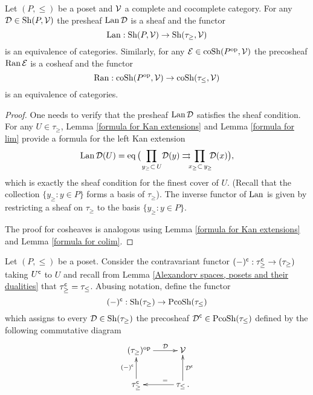 \documentclass[main.tex]{subfiles}
\begin{document}
\begin{lemma}
Let $(P,\leq)$ be a poset and $\operatorname{\mathcal{V}}$ a complete and cocomplete category. For any $\operatorname{\mathcal{D}}\in\operatorname{Sh}(P,\operatorname{\mathcal{V}})$ the presheaf $\operatorname{Lan}\operatorname{\mathcal{D}}$ is a sheaf and the functor $$\operatorname{Lan}:\operatorname{Sh}(P,\operatorname{\mathcal{V}})\to\operatorname{Sh}(\tau_{\geq},\operatorname{\mathcal{V}})$$ is an equivalence of categories.
Similarly, for any $\operatorname{\mathcal{E}}\in\operatorname{coSh}(P^{\mathrm{op}},\operatorname{\mathcal{V}})$ the precosheaf $\operatorname{Ran}\operatorname{\mathcal{E}}$ is a cosheaf and the functor $$\operatorname{Ran}:\operatorname{coSh}(P^{\mathrm{op}},\operatorname{\mathcal{V}})\to\operatorname{coSh}(\tau_{\leq},\operatorname{\mathcal{V}})$$ is an equivalence of categories.
\begin{proof}
One needs to verify that the presheaf $\operatorname{Lan}\operatorname{\mathcal{D}}$ satisfies the sheaf condition. For any $U\in\tau_\geq$, Lemma \ref{formula for Kan extensions} and Lemma \ref{formula for lim} provide a formula for the left Kan extension
$$\Lan\D(U)=\eq\big(\!\!\!\prod_{\,\,\,y_\geq \subset\, U\ }\!\!\!\D(y)\rightrightarrows\!\!\!\!\prod_{\,x_\geq\subset\, y_\geq}\!\!\!\D(x)\big),$$
which is exactly the sheaf condition for the finest cover of $U$. (Recall that the collection $\{y_\geq:y\in P\}$ forms a basis of $\tau_\geq$). The inverse functor of $\operatorname{Lan}$ is given by restricting a sheaf on $\tau_\geq$ to the basis $\{y_\geq:y\in P\}$.

The proof for cosheaves is analogous using Lemma \ref{formula for Kan extensions} and Lemma \ref{formula for colim}.
\end{proof}
\end{lemma}

\begin{definition}
Let $(P,\leq)$ be a poset. Consider the contravariant functor $(-)^{\mathsf{c}}:\tau^{\mathsf{c}}_\geq\to(\tau_\geq)$ taking $U^{\mathsf{c}}$ to $U$ and recall from Lemma \ref{Alexandorv spaces, posets and their dualities} that $\tau_\geq^{\mathsf{c}}=\tau_\leq$. Abusing notation, define the functor $$(-)^{\mathsf{c}}:\operatorname{Sh}(\tau_\geq)\to\operatorname{PcoSh}(\tau_\leq)$$
which assigns to every $\operatorname{\mathcal{D}}\in\operatorname{Sh}(\tau_\geq)$ the precosheaf $\operatorname{\mathcal{D}}^{\mathsf{c}}\in\operatorname{PcoSh}(\tau_\leq)$ defined by the following commutative diagram
$$\xymatrix{\ \ (\tau_\geq)^{\op} \ar[r]^-{\D} & \V \\ \tau_\geq^{\c}\ar[u]^{(-)^{\c}} & \tau_\leq \,. \ar[l]_{\ \ \ \ =} \ar[u]_{\D^{\c}} }$$
\end{definition}
\end{document}
